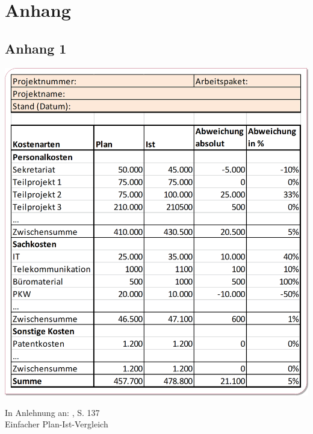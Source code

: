 \newpage
\section{Anhang}
\subsection{Anhang 1}
\label{sec:Anhang1}
\includegraphics[width=1\textwidth]{Images/PlanIstVergleich.png} 
\begin{center}
   {\footnotesize In Anlehnung an: \cite{Blazek2001}, S. 137}\\
   Einfacher Plan-Ist-Vergleich
\end{center}
\newpage
